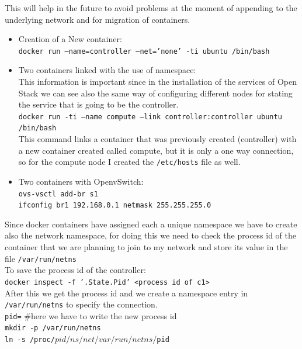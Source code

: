 This will help in the future to avoid problems at the moment of appending to the underlying network and for migration of containers.\\
\begin{itemize}
\item Creation of a New container:\\
\texttt{docker run --name=controller --net='none' -ti ubuntu /bin/bash}\\
\item Two containers linked with the use of namespace:\\
This information is important since in the installation of the services of Open Stack we can see also the same way of configuring different nodes for stating the service that is going to be the controller.\\
\texttt{docker run -ti --name compute --link controller:controller ubuntu /bin/bash}\\
This command links a container that was previously created (controller) with a new container created called compute, but it is only a one way connection, so for the compute node I created  the \texttt{/etc/hosts} file as well.
\item Two containers with OpenvSwitch:\\
\texttt{ovs-vsctl add-br s1}\\
\texttt{ifconfig br1 192.168.0.1 netmask 255.255.255.0}

\end{itemize}

Since docker containers have assigned each a unique namespace we have to create also the network namespace, for doing this we need to check the process id of the container that we are planning to join to my network and store its value in the file \texttt{/var/run/netns}\\

To save the process id of the controller:\\
\texttt{docker inspect -f '{{.State.Pid}}' <process id of c1>}\\
After this we get the process id and we create a namespace entry in \texttt{/var/run/netns} to specify the connection.\\

\texttt{pid=} #here we have to write the new process id\\
\texttt{mkdir -p /var/run/netns}\\
\texttt{ln -s /proc/$pid/ns/net /var/run/netns/$pid}\\

